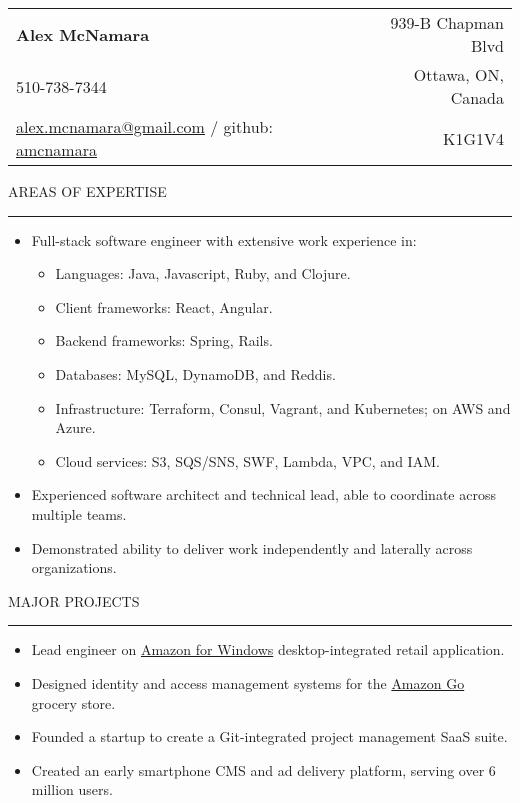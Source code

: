\documentclass[12pt]{article}
\makeatletter
\newenvironment{justifycolumns}
{\begin{tabular*}{\textwidth}{@{\extracolsep{\fill}}lr@{}}}
{\end{tabular*}}
\newcommand{\row}[2]{#1 & #2 \\}
\newcommand{\blockseparation}{\vspace{0.15in}}
\newcommand{\heading}[1]{
	\blockseparation
	\uppercase{#1}
	\vspace{0.05in}
	\hrule
	\blockseparation
}
\newenvironment{tightbullets}
{\begin{itemize}}
{\end{itemize}}
\newenvironment{bullets}
{\begin{tightbullets}}
{\end{tightbullets} \blockseparation}
\makeatother
\begin{document}
\begin{flushleft}

\begin{justifycolumns}
	\row{\Large\textbf{Alex McNamara}}{939-B Chapman Blvd}
	\row{510-738-7344}{Ottawa, ON, Canada}
	\row{
		\href{mailto:alex.mcnamara@gmail.com}{alex.mcnamara@gmail.com} / github: 
		\href{http://www.github.com/amcnamara}{amcnamara}
	}{K1G1V4}
\end{justifycolumns}

\blockseparation


\heading{Areas of Expertise}

\begin{bullets}
	\item Full-stack software engineer with extensive work experience in:
	
	\begin{tightbullets}
		\item Languages: Java, Javascript, Ruby, and Clojure.
		\item Client frameworks: React, Angular.
		\item Backend frameworks: Spring, Rails.
		\item Databases: MySQL, DynamoDB, and Reddis.
		\item Infrastructure: Terraform, Consul, Vagrant, and Kubernetes; on AWS and Azure.
		\item Cloud services: S3, SQS/SNS, SWF, Lambda, VPC, and IAM.
	\end{tightbullets}

	\item Experienced software architect and technical lead, able to coordinate across multiple teams.
	\item Demonstrated ability to deliver work independently and laterally across organizations.
\end{bullets}


\heading{Major Projects}

\begin{bullets}
	\item Lead engineer on \href{http://apps.microsoft.com/windows/en-us/app/amazon/80299018-3dee-418d-8466-374fe9463309}{Amazon for Windows} desktop-integrated retail application.
	\item Designed identity and access management systems for the \href{https://www.amazon.com/b?ie=UTF8\&node=16008589011}{Amazon Go} grocery store.
	\item Founded a startup to create a Git-integrated project management SaaS suite.
	\item Created an early smartphone CMS and ad delivery platform, serving over 6 million users.
\end{bullets}



\end{flushleft}
\end{document}
